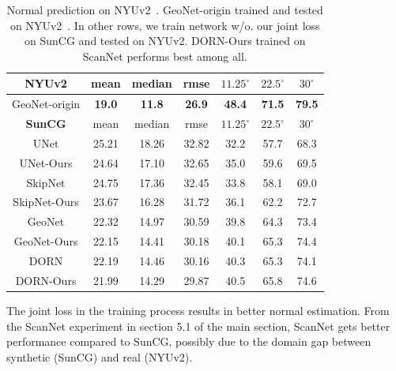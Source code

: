 \begin{table}[h]
    \centering
    \tabcolsep=0.07cm
    \begin{tabular}{|c|c|c|c||c|c|c|}
        \hline
         \textbf{NYUv2} & mean & median & rmse & $11.25^\circ$ & $22.5^\circ$ & $30^\circ$\\
         \hline
         GeoNet-origin & \textbf{19.0} & \textbf{11.8} & \textbf{26.9} & \textbf{48.4} & \textbf{71.5} & \textbf{79.5}\\
         \hline
         \hline
         \textbf{SunCG} & mean & median & rmse & $11.25^\circ$ & $22.5^\circ$ & $30^\circ$\\
         \hline
         UNet & 25.21 & 18.26 & 32.82 & 32.2 & 57.7 & 68.3\\
         \hline
         UNet-Ours & 24.64 & 17.10 & 32.65 & 35.0 & 59.6 & 69.5\\
         \hline
         SkipNet & 24.75 & 17.36 & 32.45 & 33.8 & 58.1 & 69.0\\
         \hline
         SkipNet-Ours & 23.67 & 16.28 & 31.72 & 36.1 & 62.2 & 72.7\\
         \hline
         GeoNet & 22.32 & 14.97 & 30.59 & 39.8 & 64.3 & 73.4\\
         \hline
         GeoNet-Ours & 22.15 & 14.41 & 30.18 & 40.1 & 65.3 & 74.4\\
         \hline
         DORN & 22.19 & 14.46 & 30.16 & 40.3 & 65.3 & 74.1\\
         \hline
         DORN-Ours & 21.99 & 14.29 & 29.87 & 40.5 & 65.8 & 74.6\\
         \hline         
    \end{tabular}
    \caption{Normal prediction on NYUv2~\cite{eigen2014depth}. GeoNet-origin trained and tested on NYUv2~\cite{qi2018geonet}. In other rows, we train network w/o. our joint loss on SunCG and tested on NYUv2. DORN-Ours trained on ScanNet performs best among all.}
    \label{tab:vis-nyu}
\end{table}

The joint loss in the training process results in better normal estimation. From the ScanNet experiment in section 5.1 of the main section,  ScanNet gets better performance compared to SunCG, possibly due to the domain gap between synthetic (SunCG) and real (NYUv2).

